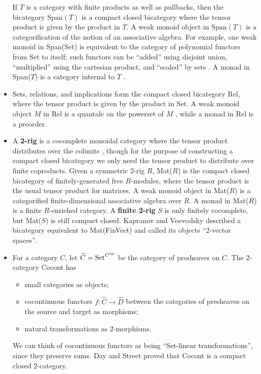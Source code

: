 \documentclass[12pt,twoside,openright]{report}
\newcommand{\Set}{\mathrm{Set}}
\newcommand{\op}{{\rm op}}
\newcommand{\Span}{\mbox{Span}}
\begin{document}
\begin{itemize}
  If $T$ is a category with finite products as well as pullbacks, then the bicategory $\Span(T)$ is a compact closed bicategory where the tensor product is given by the product in $T.$  A weak monoid object in $\Span(T)$ is a categorification of the notion of an associative algebra.  For example, one weak monoid in Span(Set) is equivalent to the category of polynomial functors from Set to itself; such functors can be ``added'' using disjoint union, ``multiplied'' using the cartesian product, and ``scaled'' by sets \cite{GK}.  A monad in Span($T$) is a category internal to $T$ \cite{Ben67}.
  
  \item Sets, relations, and implications form the compact closed bicategory Rel, where the tensor product is given by the product in Set.  A weak monoid object $M$ in Rel is a quantale on the powerset of $M$ \cite{ShulCafe}, while a monad in Rel is a preorder.

  \item A {\bf 2-rig} is a cocomplete monoidal category where the tensor product distributes over the colimits \cite{HDA3}, though for the purpose of constructing a compact closed bicategory we only need the tensor product to distribute over finite coproducts.  Given a symmetric 2-rig $R$, Mat($R$) is the compact closed bicategory of finitely-generated free $R$-modules, where the tensor product is the usual tensor product for matrices.  A weak monoid object in Mat($R$) is a categorified finite-dimensional associative algebra over $R.$  A monad in Mat($R$) is a finite $R$-enriched category.  A {\bf finite 2-rig} $S$ is only finitely cocomplete, but Mat($S$) is still compact closed. Kapranov and Voevodsky \cite{KV94} described a bicategory equivalent to Mat(FinVect) and called its objects ``2-vector spaces''.

  \item For a category $C$, let $\widehat{C} = \Set^{C^{\op}}$ be the category of presheaves on $C$.  The 2-category Cocont has
    \begin{itemize}
      \item small categories as objects;
      \item cocontinuous functors $f:\widehat{C} \to \widehat{D}$ between the categories of presheaves on the source and target as morphisms;
      \item natural transformations as 2-morphisms.
    \end{itemize}
    We can think of cocontinuous functors as being ``Set-linear transformations'', since they preserve sums.  Day and Street \cite{DS97}
proved that Cocont is a compact closed 2-category.


\end{itemize}
\end{document}
